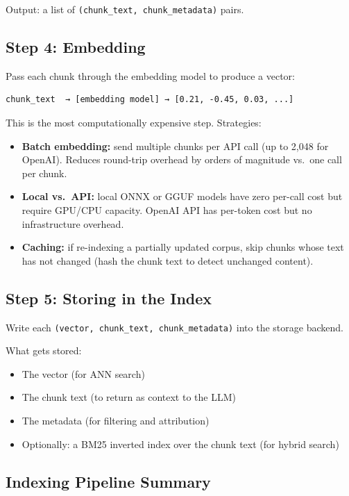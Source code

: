 Output: a list of \texttt{(chunk\_text, chunk\_metadata)} pairs.

\subsection{Step 4: Embedding}

Pass each chunk through the embedding model to produce a vector:

\begin{Verbatim}
chunk_text  → [embedding model] → [0.21, -0.45, 0.03, ...]
\end{Verbatim}

This is the most computationally expensive step. Strategies:

\begin{itemize}
    \item \textbf{Batch embedding:} send multiple chunks per API call (up to 2{,}048 for
          OpenAI). Reduces round-trip overhead by orders of magnitude vs.\ one call per chunk.
    \item \textbf{Local vs.\ API:} local ONNX or GGUF models have zero per-call cost but
          require GPU/CPU capacity. OpenAI API has per-token cost but no infrastructure overhead.
    \item \textbf{Caching:} if re-indexing a partially updated corpus, skip chunks whose text
          has not changed (hash the chunk text to detect unchanged content).
\end{itemize}

\subsection{Step 5: Storing in the Index}

Write each \texttt{(vector, chunk\_text, chunk\_metadata)} into the storage backend.

What gets stored:

\begin{itemize}
    \item The vector (for ANN search)
    \item The chunk text (to return as context to the LLM)
    \item The metadata (for filtering and attribution)
    \item Optionally: a BM25 inverted index over the chunk text (for hybrid search)
\end{itemize}

\subsection{Indexing Pipeline Summary}

